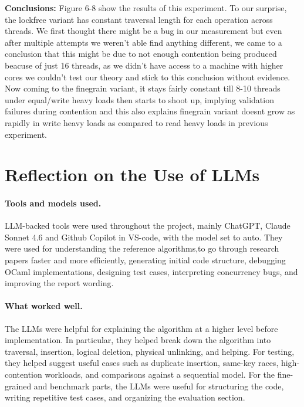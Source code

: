 \documentclass[11pt,a4paper]{article}
\begin{document}
\textbf{Conclusions:} Figure 6-8 show the results of this experiment. To our surprise, the lockfree variant has constant traversal length for each operation across threads. We first thought there might be a bug in our measurement but even after multiple attempts we weren't able find anything different, we came to a conclusion that this might be due to not enough contention being produced beacuse of just 16 threads, as we didn't have access to a machine with higher cores we couldn't test our theory and stick to this conclusion without evidence. Now coming to the finegrain variant, it stays fairly constant till 8-10 threads under equal/write heavy loads then starts to shoot up, implying validation failures during contention and this also explains finegrain variant doesnt grow as rapidly in write heavy loads as compared to read heavy loads in previous experiment. 
\section{Reflection on the Use of LLMs}
\label{sec:llm}

\paragraph{Tools and models used.}
LLM-backed tools were used throughout the project, mainly ChatGPT, Claude Sonnet 4.6 and Github Copilot in VS-code, with the model set to auto. They were used for understanding the reference algorithms,to go through research papers faster and more efficiently, generating initial code structure, debugging OCaml implementations, designing test cases, interpreting concurrency bugs, and improving the report wording. 

\paragraph{What worked well.}
The LLMs were helpful for explaining the algorithm at a higher level before implementation. In particular, they helped break down the algorithm into traversal, insertion, logical deletion, physical unlinking, and helping. For testing, they helped suggest useful cases such as duplicate insertion, same-key races, high-contention workloads, and comparisons against a sequential model. For the fine-grained and benchmark parts, the LLMs were useful for structuring the code, writing repetitive test cases, and organizing the evaluation section.
\end{document}
